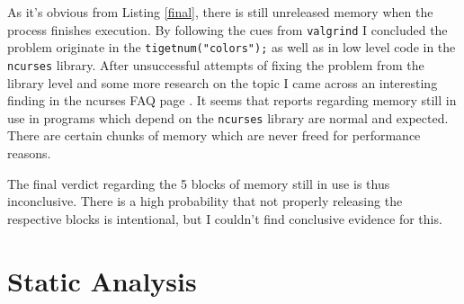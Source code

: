 \documentclass[a4paper,10pt,twocolumn,english]{article}
\begin{document}
As it's obvious from Listing \ref{final}, there is still unreleased memory when the process finishes execution. By following the cues from \lstinline{valgrind} I concluded the problem originate in the \lstinline{tigetnum("colors");} as well as in low level code in the \lstinline{ncurses} library. After unsuccessful attempts of fixing the problem from the library level and some more research on the topic I came across an interesting finding in the ncurses FAQ page \cite{ncursesfaq}. It seems that reports regarding memory still in use in programs which depend on the \lstinline{ncurses} library are normal and expected. There are certain chunks of memory which are never freed for performance reasons.

The final verdict regarding the 5 blocks of memory still in use is thus inconclusive. There is a high probability that not properly releasing the respective blocks is intentional, but I couldn't find conclusive evidence for this.

\section{Static Analysis}



\end{document}
